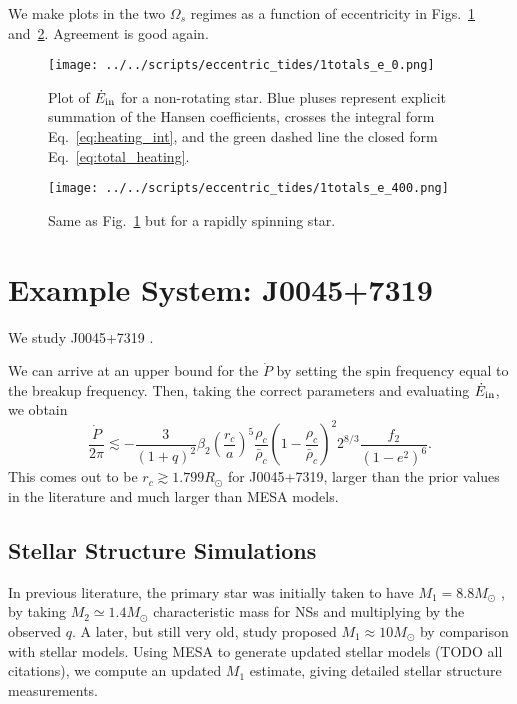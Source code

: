 \documentclass[
        fleqn,
        usenatbib,
        referee,
    ]{mnras}
\begin{document}
We make plots in the two $\Omega_s$ regimes as a function of eccentricity in
Figs.~\ref{fig:e0} and~\ref{fig:e400}. Agreement is good again.
\begin{figure}
    \centering
    \texttt{[image: ../../scripts/eccentric\_tides/1totals\_e\_0.png]}
    \caption{Plot of $\dot{E}_{\rm in}$ for a non-rotating star. Blue pluses
    represent explicit summation of the Hansen coefficients, crosses the
    integral form Eq.~\eqref{eq:heating_int}, and the green dashed line the
    closed form Eq.~\eqref{eq:total_heating}.}\label{fig:e0}
\end{figure}
\begin{figure}
    \centering
    \texttt{[image: ../../scripts/eccentric\_tides/1totals\_e\_400.png]}
    \caption{Same as Fig.~\ref{fig:e0} but for a rapidly spinning
    star.}\label{fig:e400}
\end{figure}

\section{Example System: J0045+7319}\label{s:j00457319}

We study J0045+7319 \citep{bell1995psr}.

We can arrive at an upper bound for the $\dot{P}$ by setting the spin frequency
equal to the breakup frequency. Then, taking the correct parameters and
evaluating $\dot{E}_{\rm in}$, we obtain
\begin{equation}
    \frac{\dot{P}}{2\pi} \lesssim
        -\frac{3}{(1 + q)^2}\beta_2 \left(\frac{r_c}{a}\right)^5
        \frac{\rho_c}{\bar{\rho}_c} \left(1 -
        \frac{\rho_c}{\bar{\rho}_c}\right)^2 2^{8/3}\frac{f_2}{(1 - e^2)^6}.
\end{equation}
This comes out to be $r_c \gtrsim 1.799R_{\odot}$ for J0045+7319, larger than
the prior values in the literature and much larger than MESA models.

\subsection{Stellar Structure Simulations}

In previous literature, the primary star was initially taken to have $M_1 =
8.8M_{\odot}$ \citep{kumar1998,lai1996}, by taking $M_2 \simeq 1.4M_{\odot}$
characteristic mass for NSs and multiplying by the observed $q$. A later, but
still very old, study proposed $M_1 \approx 10M_{\odot}$ by comparison with
stellar models. Using MESA to generate updated stellar models (TODO all
citations), we compute an updated $M_1$ estimate, giving detailed stellar
structure measurements.
\end{document}
